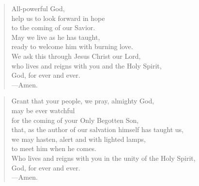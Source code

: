 \prayer

\setlength{\vleftmargin}{\prayerleftmargini}

\begin{verse}
All-powerful God,\\
help us to look forward in hope\\
to the coming of our Savior.\\
May we live as he has taught,\\
ready to welcome him with burning love.\\
We ask this through Jesus Christ our Lord,\\
who lives and reigns with you and the Holy Spirit,\\
God, for ever and ever.\\
{\color{red}---\thinspace}Amen.
\end{verse}


\begin{verse}
Grant that your people, we pray, almighty God,\\
may be ever watchful\\
for the coming of your Only Begotten Son,\\
that, as the author of our salvation himself has taught us,\\
we may hasten, alert and with lighted lamps,\\
to meet him when he comes.\\
Who lives and reigns with you in the unity of the Holy Spirit,\\
God, for ever and ever.\\
{\color{red}---\thinspace}Amen.
\end{verse}

\setlength{\vleftmargin}{\defleftmargini}